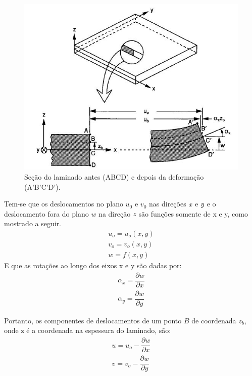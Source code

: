 \begin{figure}[h]
	\caption{\label{fig_laminatedeformation}Seção do laminado antes (ABCD) e depois da deformação (A'B'C'D').}
  \centering
  \includegraphics[scale=1.0]{figura/LaminateDeformation}
\end{figure}

Tem-se que os deslocamentos no plano $u_0$ e $v_0$ nas direções $\emph x$ e $\emph y$ e o deslocamento fora do plano $w$ na direção $\emph z$ são funções somente de x e y, como mostrado a seguir.
\begin{equation} \label{displacements}
\begin{split}
u_{o}=u_{o}(x,y)\\
v_{o}=v_{o}(x,y)\\
w=f(x,y)
\end{split}
\end{equation}
E que as rotações ao longo dos eixos x e y são dadas por:
\begin{equation} \label{rotations}
\begin{split}
\alpha_{x}=\dfrac{\partial w} {\partial x}\\
\alpha_{y}=\dfrac{\partial w} {\partial y}
\end{split}
\end{equation}

Portanto, os componentes de deslocamentos de um ponto $B$ de coordenada $z_b$, onde z é a coordenada na espessura do laminado, são:
\begin{equation} \label{displacements_B}
\begin{split}
u=u_{o} - \dfrac{\partial w}{\partial x}\\
v=v_{o} - \dfrac{\partial w}{\partial y}
\end{split}
\end{equation}

